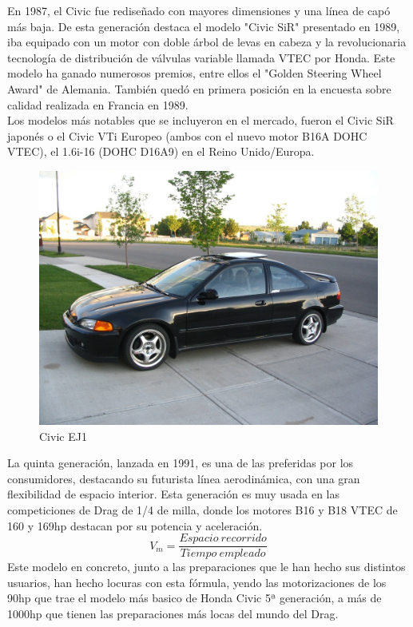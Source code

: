 \documentclass[10pt,a4paper]{report}
\begin{document}
En 1987, el Civic fue rediseñado con mayores dimensiones y una línea de capó más baja.
De esta generación destaca el modelo "Civic SiR" presentado en 1989, iba equipado con un motor con doble árbol de levas en cabeza y la revolucionaria tecnología de distribución de válvulas variable llamada VTEC por Honda. Este modelo ha ganado numerosos premios, entre ellos el "Golden Steering Wheel Award" de Alemania. También quedó en primera posición en la encuesta sobre calidad realizada en Francia en 1989.
\\
Los modelos más notables que se incluyeron en el mercado, fueron el Civic SiR japonés o el Civic VTi Europeo (ambos con el nuevo motor B16A DOHC VTEC), el 1.6i-16 (DOHC D16A9) en el Reino Unido/Europa.
\\
\begin{figure}
  \begin{center}
    \includegraphics[scale=0.20]{ej1a.jpg}
  \end{center}
  \caption{Civic EJ1}
\end{figure}
La quinta generación, lanzada en 1991, es una de las preferidas por los consumidores, destacando su futurista línea aerodinámica, con una gran flexibilidad de espacio interior.
Esta generación es muy usada en las competiciones de Drag de 1/4 de milla, donde los motores B16 y B18 VTEC de 160 y 169hp destacan por su potencia y aceleración.
\begin{equation}
V_m = \frac{Espacio\ recorrido}{Tiempo\ empleado}
\end{equation}
Este modelo en concreto, junto a las preparaciones que le han hecho sus distintos usuarios, han hecho locuras con esta fórmula, yendo las motorizaciones de los 90hp que trae el modelo más basico de Honda Civic 5ª generación, a más de 1000hp que tienen las preparaciones más locas del mundo del Drag.
\\
\end{document}
